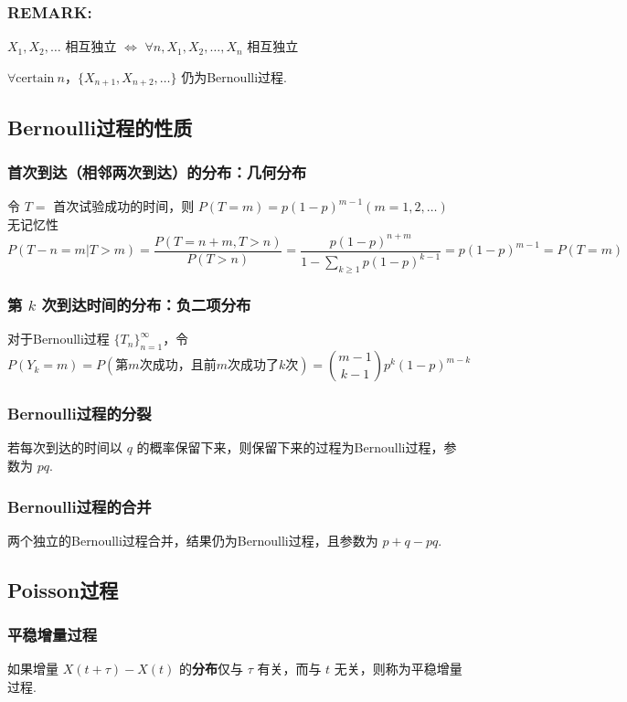 \documentclass[./main.tex]{subfiles}
\begin{document}
\subsubsection{REMARK:}
\begin{enumerate*}
    \item $X_1,X_2,\dots$ 相互独立 $\iff$ $\forall n,X_1,X_2,\dots,X_n$ 相互独立
    \item $\forall \text{certain}\ n$，$\{X_{n+1},X_{n+2},\dots\}$ 仍为Bernoulli过程. 
\end{enumerate*}
\subsection{Bernoulli过程的性质}
\subsubsection{首次到达（相邻两次到达）的分布：几何分布}
令 $T=$ 首次试验成功的时间，则 $P(T=m)=p(1-p)^{m-1}(m=1,2,\dots)$\\
无记忆性
\begin{equation}
    P(T-n=m|T>m)=\frac{P(T=n+m,T>n)}{P(T>n)}=\frac{p(1-p)^{n+m}}{1-\sum_{k\ge 1}p(1-p)^{k-1}}=p(1-p)^{m-1}=P(T=m)
\end{equation}
\subsubsection{第 $k$ 次到达时间的分布：负二项分布}
对于Bernoulli过程 $\{T_n\}_{n=1}^{\infty}$，令$$P(Y_k=m)=P(\text{第$m$次成功，且前$m$次成功了$k$次})=\binom{m-1}{k-1}p^k(1-p)^{m-k}$$
\subsubsection{Bernoulli过程的分裂}
若每次到达的时间以 $q$ 的概率保留下来，则保留下来的过程为Bernoulli过程，参数为 $pq$. 
\subsubsection{Bernoulli过程的合并}
两个独立的Bernoulli过程合并，结果仍为Bernoulli过程，且参数为 $p+q-pq$. 
\subsection{Poisson过程}
\subsubsection{平稳增量过程}
 如果增量 $X(t+\tau)-X(t)$ 的\textbf{分布}仅与 $\tau$ 有关，而与 $t$ 无关，则称为平稳增量过程. 
\end{document}
